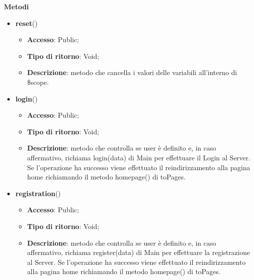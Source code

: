{{\begin{itemize}
\begin{itemize}
			\end{itemize}
	    \end{itemize}
		\textbf{Metodi}
		\begin{itemize}
			\item \textbf{reset}()
			\begin{itemize}
				\item \textbf{Accesso}: Public;
				\item \textbf{Tipo di ritorno}: Void;
				\item \textbf{Descrizione}: metodo che cancella i valori delle variabili all'interno di \$scope.
			\end{itemize}
			\item \textbf{login}()
			\begin{itemize}
				\item \textbf{Accesso}: Public;
				\item \textbf{Tipo di ritorno}: Void;
				\item \textbf{Descrizione}: metodo che controlla se user è definito e, in caso affermativo, richiama login(data) di Main per effettuare il Login\ped{g} al Server. Se l'operazione ha successo viene effettuato il reindirizzamento alla pagina home richiamando il metodo homepage() di toPages.
			\end{itemize}
	        \item \textbf{registration}()
			\begin{itemize}
				\item \textbf{Accesso}: Public;
				\item \textbf{Tipo di ritorno}: Void;
				\item \textbf{Descrizione}: metodo che controlla se user è definito e, in caso affermativo, richiama register(data) di Main per effettuare la registrazione al Server. Se l'operazione ha successo viene effettuato il reindirizzamento alla pagina home richiamando il metodo homepage() di toPages.
			\end{itemize}
		\end{itemize}
	}
}
